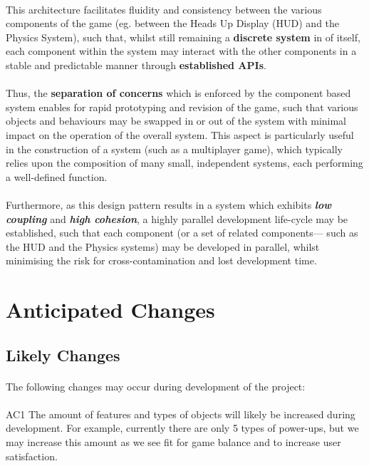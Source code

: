 \documentclass[12pt, titlepage]{article}
\begin{document}
\paragraph{}This architecture facilitates fluidity and consistency between the various components of the game (eg. between the Heads Up Display (HUD) and the Physics System), such that, whilst still remaining a \textbf{discrete system} in of itself, each component within the system may interact with the other components in a stable and predictable manner through \textbf{established APIs}. 
\paragraph{}Thus, the \textbf{separation of concerns} which is enforced by the component based system enables for rapid prototyping and revision of the game, such that various objects and behaviours may be swapped in or out of the system with minimal impact on the operation of the overall system. This aspect is particularly useful in the construction of a system (such as a multiplayer game), which typically relies upon the composition of many small, independent systems, each performing a well-defined function.
\paragraph{}Furthermore, as this design pattern results in a system which exhibits \textbf{\emph{low coupling}} and \textbf{\emph{high cohesion}}, a highly parallel development life-cycle may be established, such that each component (or a set of related components--- such as the HUD and the Physics systems) may be developed in parallel, whilst minimising the risk for cross-contamination and lost development time.

\section{Anticipated Changes}

\subsection{Likely Changes}
\paragraph{}The following changes may occur during development of the project:
\paragraph{}AC1 The amount of features and types of objects will likely be increased during development. For example, currently there are only 5 types of power-ups, but we may increase this amount as we see fit for game balance and to increase user satisfaction.
\end{document}
